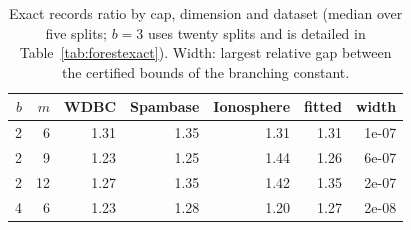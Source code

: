 \begin{table}[h]
\centering
\caption{Exact records ratio by cap, dimension and dataset (median over five splits; $b=3$ uses twenty splits and is detailed in Table~\ref{tab:forestexact}). Width: largest relative gap between the certified bounds of the branching constant.}
\label{tab:capdetail}
\small
\begin{tabular}{rrrrrrr}
\toprule
$b$ & $m$ & WDBC & Spambase & Ionosphere & fitted & width \\
\midrule
2 & 6 & 1.31 & 1.35 & 1.31 & 1.31 & 1e-07 \\
2 & 9 & 1.23 & 1.25 & 1.44 & 1.26 & 6e-07 \\
2 & 12 & 1.27 & 1.35 & 1.42 & 1.35 & 2e-07 \\
4 & 6 & 1.23 & 1.28 & 1.20 & 1.27 & 2e-08 \\
\bottomrule
\end{tabular}
\end{table}
